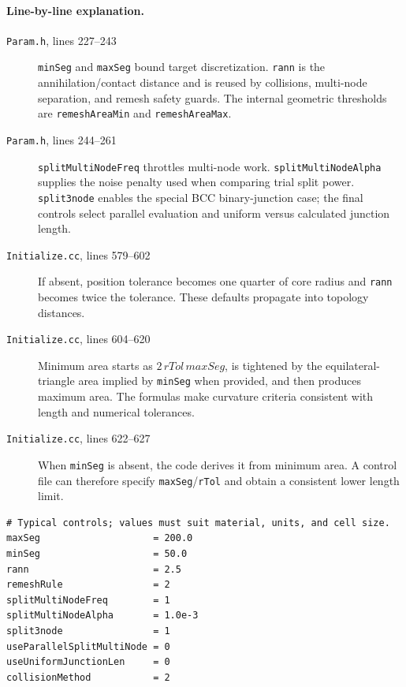 \documentclass[11pt]{article}
\newcommand{\code}[1]{\texorpdfstring{\nolinkurl{#1}}{#1}}
\newcommand{\srcfile}[1]{\texorpdfstring{\nolinkurl{#1}}{#1}}
\begin{document}




\paragraph{Line-by-line explanation.}
\begin{description}
\item[\srcfile{Param.h}, lines 227--243] \code{minSeg} and \code{maxSeg}
bound target discretization. \code{rann} is the annihilation/contact distance
and is reused by collisions, multi-node separation, and remesh safety guards.
The internal geometric thresholds are \code{remeshAreaMin} and
\code{remeshAreaMax}.
\item[\srcfile{Param.h}, lines 244--261] \code{splitMultiNodeFreq} throttles
multi-node work. \code{splitMultiNodeAlpha} supplies the noise penalty used
when comparing trial split power. \code{split3node} enables the special BCC
binary-junction case; the final controls select parallel evaluation and
uniform versus calculated junction length.
\item[\srcfile{Initialize.cc}, lines 579--602] If absent, position tolerance
becomes one quarter of core radius and \code{rann} becomes twice the
tolerance. These defaults propagate into topology distances.
\item[\srcfile{Initialize.cc}, lines 604--620] Minimum area starts as
\(2\,rTol\,maxSeg\), is tightened by the equilateral-triangle area implied by
\code{minSeg} when provided, and then produces maximum area. The formulas
make curvature criteria consistent with length and numerical tolerances.
\item[\srcfile{Initialize.cc}, lines 622--627] When \code{minSeg} is absent,
the code derives it from minimum area. A control file can therefore specify
\code{maxSeg}/\code{rTol} and obtain a consistent lower length limit.
\end{description}

\begin{lstlisting}[style=data]
# Typical controls; values must suit material, units, and cell size.
maxSeg                    = 200.0
minSeg                    = 50.0
rann                      = 2.5
remeshRule                = 2
splitMultiNodeFreq        = 1
splitMultiNodeAlpha       = 1.0e-3
split3node                = 1
useParallelSplitMultiNode = 0
useUniformJunctionLen     = 0
collisionMethod           = 2
\end{lstlisting}
\end{document}
